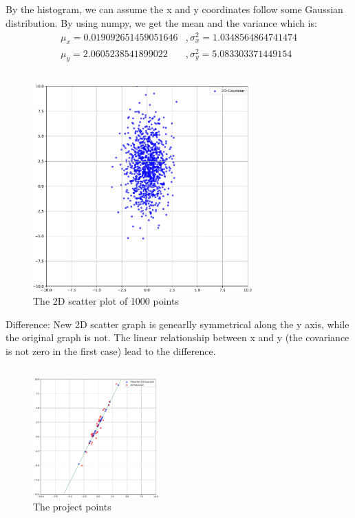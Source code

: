 \documentclass{article}
\begin{document}
\subsection{}%
By the histogram, we can assume the x and y coordinates follow some Gaussian distribution. By using numpy, we get the mean and the variance which is:
\begin{align*}
    \mu_x = 0.019092651459051646 &, \sigma^2_x = 1.0348564864741474 \\
    \mu_y = 2.0605238541899022 &, \sigma^2_y = 5.083303371449154
\end{align*}
\subsection{}%
\begin{figure}[htbp]
    \begin{center}
        \includegraphics[width=0.75\textwidth]{./assist/figure4.3.pdf}
    \caption{The 2D scatter plot of 1000 points}
    \end{center}
\end{figure}
Difference: New 2D scatter graph is genearlly symmetrical along the y axis, while the original graph is not. The linear relationship between x and y (the covariance is not zero in the first case) lead to the difference.
\clearpage
\subsection{}%
\begin{figure}[htbp]
    \begin{center}
        \includegraphics[width=0.43\textwidth]{./assist/figure4.5.pdf}
        \caption{The project points}
    \end{center}
\end{figure}
\end{document}
